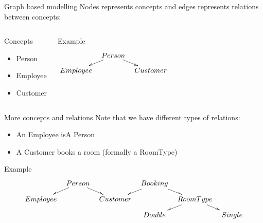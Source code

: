 \documentclass[slidetop,mathserif,red]{beamer}
\begin{document}
\begin{frame}{Graph based modelling}
Nodes represents concepts and edges represents relations between concepts:

    \begin{columns}[T]
    \begin{block}{Concepts}
        \begin{itemize}
        \item Person 
        \item Employee
        \item Customer
        \end{itemize}
    \end{block}
    \begin{block}{Example}
     \[\xymatrixrowsep{0.1in}
		\xymatrixcolsep{0.1in}
      \xymatrix{		& Person \ar[dl] \ar[dr]\\
      					Employee		&& Customer} \]
    \end{block}

  \end{columns}
\end{frame}


\begin{frame}{More concepts and relations}
Note that we have different types of relations:
\begin{itemize}
\item An Employee isA Person
\item A Customer books a room (formally a RoomType)
\end{itemize}

    {Example}
     \[\xymatrixrowsep{0.1in}
		\xymatrixcolsep{0.1in}
      \xymatrix{		& Person \ar[dl] \ar[dr]		&& Booking \ar[dl]\ar[dr]\\
      					Employee		&& Customer	& 						&RoomType \ar[dl] \ar[dr]\\
      																&&& Double			&& Single} \]
    
\end{frame}
\end{document}
